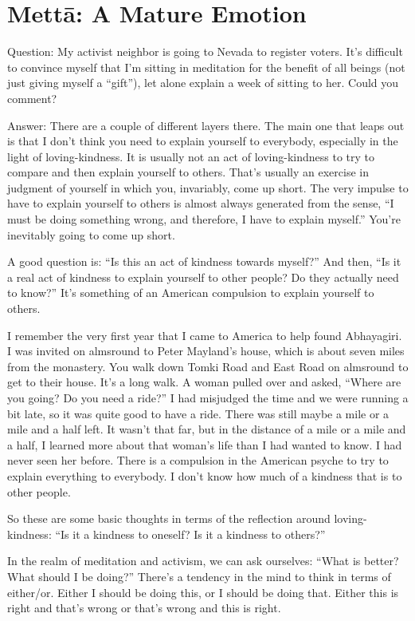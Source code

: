 \chapter{Mettā: A Mature Emotion}

\qaspace
Question: My activist neighbor is going to Nevada to register voters.
It’s difficult to convince myself that I’m sitting in meditation for the
benefit of all beings (not just giving myself a “gift”), let alone
explain a week of sitting to her. Could you comment?

\qaspace
Answer: There are a couple of different layers there. The main one that
leaps out is that I don’t think you need to explain yourself to
everybody, especially in the light of loving-kindness. It is usually not
an act of loving-kindness to try to compare and then explain yourself to
others. That’s usually an exercise in judgment of yourself in which you,
invariably, come up short. The very impulse to have to explain yourself
to others is almost always generated from the sense, “I must be doing
something wrong, and therefore, I have to explain myself.” You’re
inevitably going to come up short.

A good question is: “Is this an act of kindness towards myself?” And
then, “Is it a real act of kindness to explain yourself to other people?
Do they actually need to know?” It’s something of an American compulsion
to explain yourself to others.

I remember the very first year that I came to America to help found
Abhayagiri. I was invited on almsround to Peter Mayland’s house, which
is about seven miles from the monastery. You walk down Tomki Road and
East Road on almsround to get to their house. It’s a long walk. A woman
pulled over and asked, “Where are you going? Do you need a ride?” I had
misjudged the time and we were running a bit late, so it was quite good
to have a ride. There was still maybe a mile or a mile and a half left.
It wasn’t that far, but in the distance of a mile or a mile and a half,
I learned more about that woman’s life than I had wanted to know. I had
never seen her before. There is a compulsion in the American psyche to
try to explain everything to everybody. I don’t know how much of a
kindness that is to other people.

So these are some basic thoughts in terms of the reflection around
loving-kindness: “Is it a kindness to oneself? Is it a kindness to
others?”

In the realm of meditation and activism, we can ask ourselves: “What is
better? What should I be doing?” There’s a tendency in the mind to think
in terms of either/or. Either I should be doing this, or I should be
doing that. Either this is right and that’s wrong or that’s wrong and
this is right.

